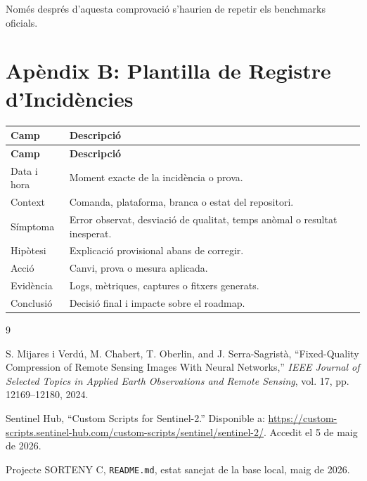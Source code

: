 \documentclass[11pt,a4paper]{article}
\begin{document}
Només després d'aquesta comprovació s'haurien de repetir els benchmarks oficials.

\section{Apèndix B: Plantilla de Registre d'Incidències}

\begin{longtable}{p{3.0cm} p{11.0cm}}
\toprule
\textbf{Camp} & \textbf{Descripció} \\
\midrule
\endfirsthead
\toprule
\textbf{Camp} & \textbf{Descripció} \\
\midrule
\endhead
Data i hora & Moment exacte de la incidència o prova. \\
Context & Comanda, plataforma, branca o estat del repositori. \\
Símptoma & Error observat, desviació de qualitat, temps anòmal o resultat inesperat. \\
Hipòtesi & Explicació provisional abans de corregir. \\
Acció & Canvi, prova o mesura aplicada. \\
Evidència & Logs, mètriques, captures o fitxers generats. \\
Conclusió & Decisió final i impacte sobre el roadmap. \\
\bottomrule
\end{longtable}

\begin{thebibliography}{9}

S. Mijares i Verdú, M. Chabert, T. Oberlin, and J. Serra-Sagristà,
``Fixed-Quality Compression of Remote Sensing Images With Neural Networks,''
\textit{IEEE Journal of Selected Topics in Applied Earth Observations and Remote Sensing},
vol. 17, pp. 12169--12180, 2024.

Sentinel Hub,
``Custom Scripts for Sentinel-2.''
Disponible a:
\url{https://custom-scripts.sentinel-hub.com/custom-scripts/sentinel/sentinel-2/}.
Accedit el 5 de maig de 2026.

Projecte SORTENY C,
\texttt{README.md},
estat sanejat de la base local, maig de 2026.

\end{thebibliography}
\end{document}
